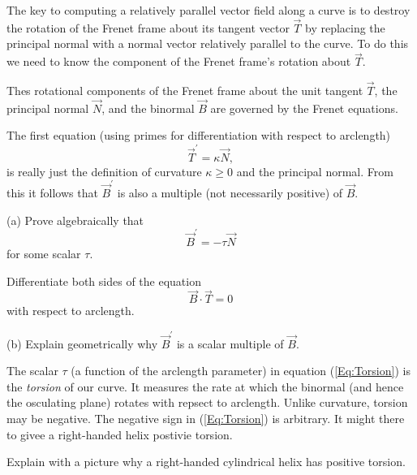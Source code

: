 \documentclass{ximera}
\begin{document}
The key to computing a relatively parallel vector field along a curve is to destroy the rotation of the Frenet frame about its tangent vector $\overrightarrow{T}$ by replacing the principal normal with a normal vector relatively parallel to the curve. To do this we need to know the component of the Frenet frame's rotation about $\overrightarrow{T}$.

Thes rotational components of the Frenet frame about the unit tangent $\overrightarrow{T}$, the principal normal $\overrightarrow{N}$, and the binormal $\overrightarrow{B}$ are governed by the Frenet equations. 

The first equation (using primes for differentiation with respect to arclength)
\begin{equation}
       \overrightarrow{T}^\prime = \kappa \overrightarrow{N} ,   \label{Eq:Curvature}
\end{equation}
is really just the definition of curvature $\kappa \geq 0$ and the principal normal. From this it follows that $\overrightarrow{B}^\prime$ is also a multiple (not necessarily positive) of $\overrightarrow{B}$. 

\begin{exercise}  \label{E:Kldsfttdd}
(a) Prove algebraically that
\begin{equation}
   \overrightarrow{B}^\prime = - \tau \overrightarrow{N}   \label{Eq:Torsion}
\end{equation}
for some scalar $\tau$. 

\begin{hint}
Differentiate both sides of the equation
\[
  \overrightarrow{B} \cdot \overrightarrow{T} = 0
\]
with respect to arclength.
\end{hint}

(b) Explain geometrically why $\overrightarrow{B}^\prime$ is a scalar multiple of $\overrightarrow{B}$. 
\end{exercise}

The scalar $\tau$ (a function of the arclength parameter) in equation (\ref{Eq:Torsion}) is the \emph{torsion} of our curve. It measures the rate at which the binormal (and hence the osculating plane) rotates with repsect to arclength. Unlike curvature, torsion may be negative. The negative sign in (\ref{Eq:Torsion}) is arbitrary. It might there to givee a right-handed helix 
postivie torsion.

\begin{exercise} \label{E:dsft4etdg}
Explain with a picture why a right-handed cylindrical helix has positive torsion.
\end{exercise}
\end{document}
